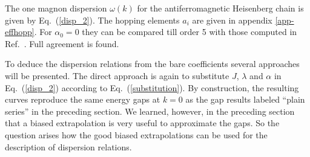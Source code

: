 The one magnon dispersion $\omega(k)$ for the antiferromagnetic Heisenberg
 chain is given by Eq.~(\ref{disp_2}). The hopping elements $a_i$ are
 given in appendix \ref{app-effhopp}. 
For $\alpha_0=0$ they can be compared till order 5
with those computed in  Ref.~\cite{barne98}. Full agreement is found.

To deduce the dispersion relations from  the bare coefficients
several approaches will be presented.
The direct approach is again to substitute $J$, $\lambda$ and $\alpha$ in
 Eq.~(\ref{disp_2}) according to Eq.~(\ref{substitution}). 
By construction, the resulting curves reproduce the same
 energy gaps at $k=0$ as the gap results labeled ``plain series'' in
 the preceding section. We learned, however, in the preceding section
that a biased extrapolation is very useful to approximate the gaps.
So the question arises how the good biased extrapolations can be
used for the description of dispersion relations.


